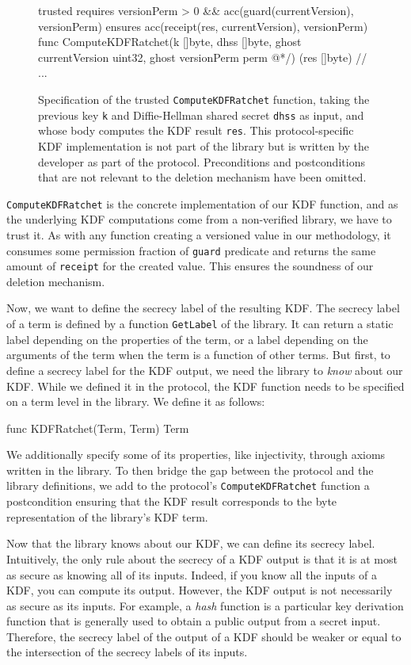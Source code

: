\begin{figure}
    \begin{gobra}
trusted
requires versionPerm > 0 && acc(guard(currentVersion), versionPerm)
ensures  acc(receipt(res, currentVersion), versionPerm)
func ComputeKDFRatchet(k []byte, dhss []byte, ghost currentVersion
    uint32, ghost versionPerm perm @*/) (res []byte) {
    // ...
}
    \end{gobra}
    \caption{Specification of the trusted \texttt{ComputeKDFRatchet} function, taking the previous key \texttt{k} and Diffie-Hellman shared secret \texttt{dhss} as input, and whose body computes the KDF result \texttt{res}. This protocol-specific KDF implementation is not part of the library but is written by the developer as part of the protocol. Preconditions and postconditions that are not relevant to the deletion mechanism have been omitted.}
    \label{lst:kdf-ratchet}
\end{figure}

\texttt{ComputeKDFRatchet} is the concrete implementation of our KDF function, and as the underlying KDF computations come from a non-verified library, we have to trust it.
As with any function creating a versioned value in our methodology, it consumes some permission fraction of \texttt{guard} predicate and returns the same amount of \texttt{receipt} for the created value. This ensures the soundness of our deletion mechanism.

Now, we want to define the secrecy label of the resulting KDF.
The secrecy label of a term is defined by a function \texttt{GetLabel} of the library. It can return a static label depending on the properties of the term, or a label depending on the arguments of the term when the term is a function of other terms. 
But first, to define a secrecy label for the KDF output, we need the library to \emph{know} about our KDF. While we defined it in the protocol, the KDF function needs to be specified on a term level in the library. We define it as follows:
\begin{gobra}
func KDFRatchet(Term, Term) Term
\end{gobra}
We additionally specify some of its properties, like injectivity, through axioms written in the library.
To then bridge the gap between the protocol and the library definitions, we add to the protocol's \texttt{ComputeKDFRatchet} function a postcondition ensuring that the KDF result corresponds to the byte representation of the library's KDF term.

Now that the library knows about our KDF, we can define its secrecy label.
Intuitively, the only rule about the secrecy of a KDF output is that it is at most as secure as knowing all of its inputs. Indeed, if you know all the inputs of a KDF, you can compute its output.
However, the KDF output is not necessarily as secure as its inputs. For example, a \emph{hash} function is a particular key derivation function that is generally used to obtain a public output from a secret input. 
Therefore, the secrecy label of the output of a KDF should be weaker or equal to the intersection of the secrecy labels of its inputs.

